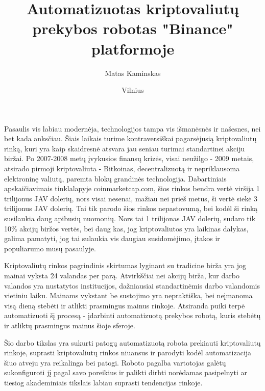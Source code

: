 \documentclass{VUMIFInfKursinis}
\institute{Informatikos institutas}  %
\title{Automatizuotas kriptovaliutų prekybos robotas "Binance" platformoje}
\author{Matas Kaminskas}
\date{Vilnius \\ \the\year}
\begin{document}
\maketitle

\tableofcontents

Pasaulis vis labiau modernėja, technologijos tampa vis išmanėsnės ir našesnes, nei bet kada anksčiau. Šiais laikais turime kontraversiškai pagarsėjusią
kriptovaliutų rinką, kuri yra kaip skaidresnė atsvara jau seniau turimai standartinei akciju biržai. Po 2007-2008 metų įvykusios finansų krizės, 
visai neužilgo - \cite{SatBitcoin}2009 metais, atsirado pirmoji kriptovaliuta - Bitkoinas, decentralizuotą ir nepriklausoma elektroninę valiutą, paremta
blokų grandinės technologija. Dabartiniais apskaičiavimais tinklalapyje coinmarketcap.com, šios rinkos bendra vertė viršija 1 trilijonus JAV dolerių, 
nors visai nesenai, mažiau nei prieš metus, ši vertė siekė 3 trilijonus JAV dolerių. Tai tik parodo šios rinkos nepastovumą, bei kodėl ši rinką susilaukia
daug apibusių nuomonių. Nors tai 1 trilijonas JAV dolerių, sudaro tik 10\% akcijų biržos vertės, bei daug kas, jog kriptovaliutos yra laikinas dalykas,
galima pamatyti, jog tai sulaukia vis daugiau susidomėjimo, įtakos ir populiarumo mūsų pasaulyje.     

Kriptovaliutų rinkos pagrindinis skirtumas lyginant su tradicine birža yra jog mainai vyksta 24 valandas per parą. Atvirkščiai nei akcijų birža, kur 
darbo valandos yra nustatytos institucijos, dažniausiai standartinėmis darbo valandomis vietiniu laiku. Mainams vykstant be sustojimo yra nepraktiška, 
bei neįmanoma visą dieną stebėti ir atlikti prasmingus mainus rinkoje. Atsiranda puiki terpė automatizuoti šį procesą - įdarbinti automatizuotą prekybos 
robotą, kuris stebėtų ir atliktų prasmingus mainus šioje sferoje.

Šio darbo tikslas yra sukurti patogų automatizuotą robota prekiauti kriptovaliutų rinkoje, suprasti kriptovaliutų rinkos niuansus ir parodyti kodėl 
automatizacija šiuo atveju yra reikalinga bei patogi. Roboto pagalba vartotojas galėtų sukonfiguroti jį pagal savo poreikius ir palikti dirbti norėdamas 
pasipelnyti ar tiesiog akademiniais tikslais labiau suprasti tendencijas rinkoje.
\end{document}
